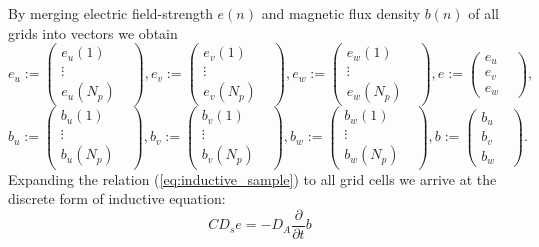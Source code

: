 By merging electric field-strength $e(n)$ and magnetic flux density $b(n)$ of all grids into vectors we obtain
\begin{equation*}
e_{u}:=
\begin{pmatrix}
e_{u}(1)&\\
\vdots&\\
e_{u}(N_{p})&
\end{pmatrix},
e_{v}:=
\begin{pmatrix}
e_{v}(1)&\\
\vdots&\\
e_{v}(N_{p})&
\end{pmatrix},
e_{w}:=
\begin{pmatrix}
e_{w}(1)&\\
\vdots&\\
e_{w}(N_{p})&
\end{pmatrix},
e:=
\begin{pmatrix}
e_{u}&\\
e_{v}&\\
e_{w}&
\end{pmatrix},
\label{eq:vector_e_field}
\end{equation*}
\begin{equation*}
b_{u}:=
\begin{pmatrix}
b_{u}(1)&\\
\vdots&\\
b_{u}(N_{p})&
\end{pmatrix},
b_{v}:=
\begin{pmatrix}
b_{v}(1)&\\
\vdots&\\
b_{v}(N_{p})&
\end{pmatrix},
b_{w}:=
\begin{pmatrix}
b_{w}(1)&\\
\vdots&\\
b_{w}(N_{p})&
\end{pmatrix},
b:=
\begin{pmatrix}
b_{u}&\\
b_{v}&\\
b_{w}&
\end{pmatrix}.
\label{eq:vector_m_flux_density}
\end{equation*}
Expanding the relation (\ref{eq:inductive_sample}) to all grid cells \cite{FIT_discrete_method,FIT_discrete_electrommagnetism} we arrive at the discrete form of inductive equation:
\begin{equation}
CD_{s}e=-D_{A}\frac{\partial}{\partial{t}}b
\label{eq:inductive_sample_all}
\end{equation}
